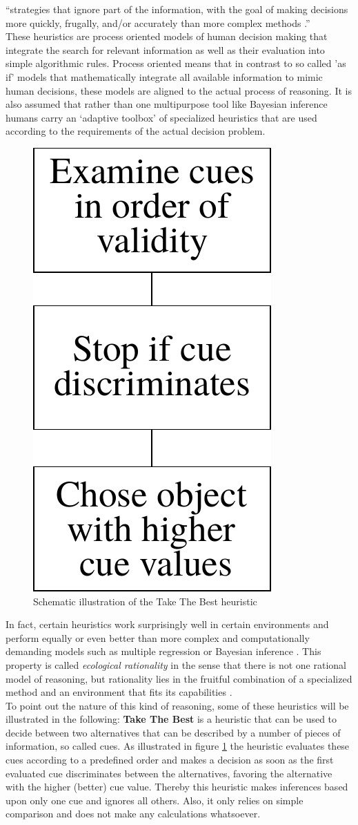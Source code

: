 ``strategies that ignore part of the information, with the goal of making decisions more quickly, frugally, and/or accurately than more complex methods \cite{Gigerenzer2011}.'' \\

These heuristics are process oriented models of human decision making that integrate the search for relevant information as well as their evaluation into simple algorithmic rules. Process oriented means that in contrast to so called 'as if' models that mathematically integrate all available information to mimic human decisions, these models are aligned to the actual process of reasoning. It is also assumed that rather than one multipurpose tool like Bayesian inference humans carry an `adaptive toolbox' of specialized heuristics \cite{gigerenzer2002bounded} that are used according to the requirements of the actual decision problem.
\begin{figure}
  \centering
  \includegraphics[width = .2 \textwidth]{figures/TTB.pdf}
  \caption{Schematic illustration of the Take The Best heuristic}
  \label{TTB}
\end{figure}
In fact, certain heuristics work surprisingly well in certain environments and perform equally or even better than more complex and computationally demanding models such as multiple regression or Bayesian inference \cite{Gigerenzer2009}. This property is called \emph{ecological rationality} in the sense that there is not one rational model of reasoning, but rationality lies in the fruitful combination of a specialized method and an environment that fits its capabilities \cite{todd2007environments}.\\
To point out the nature of this kind of reasoning, some of these heuristics will be illustrated in the following: \textbf{Take The Best} \cite{Gigerenzer1996} is a heuristic that
can be used to decide between two alternatives that can be described by a number of pieces of information, so called cues. As illustrated in figure \ref{TTB} the heuristic evaluates these cues according to a predefined order and makes a decision as soon as the first evaluated cue discriminates between the alternatives, favoring the alternative with the higher (better) cue value. Thereby this heuristic makes inferences based upon only one cue and ignores all others. Also, it only relies on simple comparison and does not make any calculations whatsoever.\\
